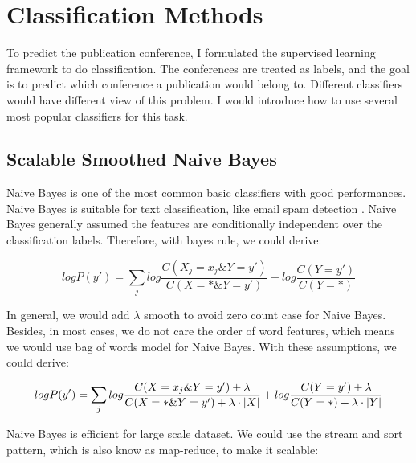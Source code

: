 \section{Classification Methods}
To predict the publication conference, I formulated the supervised learning
framework to do classification. The conferences are treated as labels, and the
goal is to predict which conference a publication would belong to. Different
classifiers would have different view of this problem. I would introduce how to
use several most popular classifiers for this task.


\subsection{Scalable Smoothed Naive Bayes}
Naive Bayes is one of the most common basic classifiers with good performances.
Naive Bayes is suitable for text classification, like email spam detection
\cite{metsis2006spam}. Naive Bayes generally assumed the features are conditionally
independent over the classification labels. Therefore, with bayes rule, we could
derive:

\begin{equation*}
log P(y') = \sum_j log \frac{C (X_j=x_j \& Y=y')}{C (X=* \& Y=y')} +
log \frac{C (Y=y')}{C (Y=*)}
\end{equation*}

In general, we would add $\lambda$ smooth to avoid zero count case for Naive
Bayes. Besides, in most cases, we do not care the order of word features, which
means we would use bag of words model for Naive Bayes. With these assumptions,
we could derive:

\begin{equation*}
log P(y') = \sum_j log \frac{C(X=x_j \& Y=y')+\lambda}
{C(X=* \& Y=y') + \lambda \cdot \left\lvert X \right\rvert } +
log \frac{C (Y=y')+\lambda}{C (Y=*)+\lambda \cdot \left\lvert Y \right\rvert }
\end{equation*}

Naive Bayes is efficient for large scale dataset. We could use the stream and
sort pattern, which is also know as map-reduce, to make it scalable:

